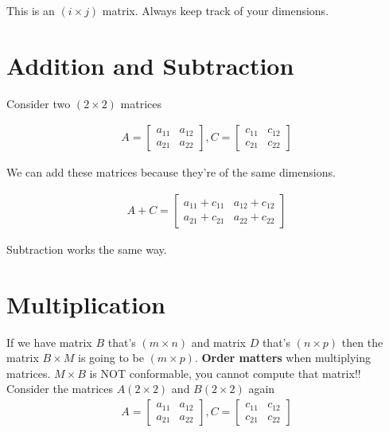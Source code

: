 \documentclass{article}
\begin{document}
This is an $(i \times j)$ matrix. Always keep track of your dimensions. 

\section{Addition and Subtraction} 
Consider two $(2 \times 2)$ matrices 

\begin{align}
    A = \begin{bmatrix}
            a_{11} & a_{12} \\
            a_{21} & a_{22}
        \end{bmatrix}, 
    C = \begin{bmatrix}
            c_{11} & c_{12} \\
            c_{21} & c_{22}
        \end{bmatrix}
\end{align}

We can add these matrices because they're of the same dimensions. 

\begin{align}
    A + C = \begin{bmatrix}
                a_{11} + c_{11} & a_{12} + c_{12} \\
                a_{21} + c_{21} & a_{22} + c_{22}
            \end{bmatrix}
\end{align}

Subtraction works the same way. 

\section{Multiplication}
If we have matrix $B$ that's $(m \times n)$ and matrix $D$ that's $(n \times p)$ then the matrix $B \times M$ is going to be $(m \times p)$. \textbf{Order matters} when multiplying matrices. $M \times B$ is NOT conformable, you cannot compute that matrix!! \\

Consider the matrices $A (2 \times 2)$  and $B (2 \times 2)$ again 
\begin{align}
    A = \begin{bmatrix}
            a_{11} & a_{12} \\
            a_{21} & a_{22}
        \end{bmatrix}, 
    C = \begin{bmatrix}
            c_{11} & c_{12} \\
            c_{21} & c_{22}
        \end{bmatrix}
\end{align}
\end{document}
